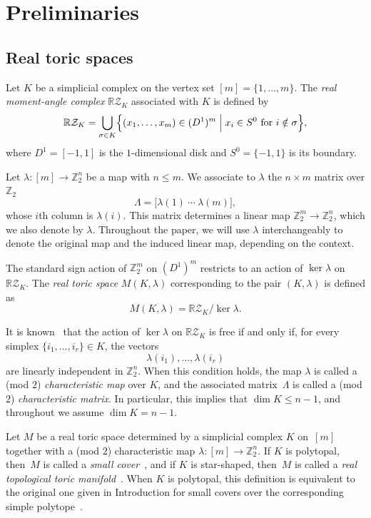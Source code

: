 \documentclass{amsart}
\newcommand{\cZ}{\mathcal{Z}}
\newcommand{\R}{\mathbb{R}}
\newcommand{\Z}{\mathbb{Z}}
\theoremstyle{plain}
\numberwithin{equation}{section}
\theoremstyle{definition}
\theoremstyle{remark}
\begin{document}
\section{Preliminaries}\label{sec:pre}

\subsection{Real toric spaces}
Let $K$ be a simplicial complex on the vertex set $[m] = \{1,\ldots,m\}$.
The \emph{real moment-angle complex} $\R\cZ_{K}$ associated with $K$ is defined by
\[
\R\cZ_{K}
= \bigcup_{\sigma \in K}
\Bigl\{ (x_1,\ldots,x_m) \in (D^1)^m \;\Big|\; x_i \in S^0 \text{ for } i \notin \sigma \Bigr\},
\]
where $D^1 = [-1,1]$ is the $1$-dimensional disk and $S^0 = \{-1,1\}$ is its boundary.

Let $\lambda \colon [m] \to \Z_2^n$ be a map with $n \le m$. 
We associate to $\lambda$ the $n \times m$ matrix over $\Z_2$
\[
\Lambda = \big[\lambda(1)\ \cdots\ \lambda(m)\big],
\]
whose $i$th column is $\lambda(i)$. 
This matrix determines a linear map $\Z_2^m \to \Z_2^n$, which we also denote by $\lambda$.
Throughout the paper, we will use $\lambda$ interchangeably to denote the original map and the induced linear map, depending on the context.

The standard sign action of $\Z_2^m$ on $(D^1)^m$ restricts to an action of $\ker \lambda$ on $\R\cZ_{K}$.
The \emph{real toric space} $M(K,\lambda)$ corresponding to the pair $(K,\lambda)$ is defined as
$$
    M(K,\lambda) = \R\cZ_{K} / \ker \lambda.
$$

It is known~\cite{Choi-Kaji-Theriault2017} that the action of $\ker \lambda$ on $\R\cZ_{K}$ is free if and only if, for every simplex $\{i_1,\ldots,i_r\} \in K$, the vectors
\[
\lambda(i_1), \ldots, \lambda(i_r)
\]
are linearly independent in $\Z_2^n$.
When this condition holds, the map $\lambda$ is called a (mod $2$) \emph{characteristic map} over $K$, and the associated matrix~$\Lambda$ is called a (mod $2$) \emph{characteristic matrix}.
In particular, this implies that $\dim K \le n-1$, and throughout we assume $\dim K = n-1$.

Let $M$ be a real toric space determined by a simplicial complex $K$ on~$[m]$ together with a (mod $2$) characteristic map $\lambda \colon [m] \to \Z_2^n$.
If $K$ is polytopal, then~$M$ is called a \emph{small cover}~\cite{Davis-Januszkiewicz1991}, and if $K$ is star-shaped, then~$M$ is called a \emph{real topological toric manifold}~\cite{Ishida-Fukukawa-Masuda2013}.
When $K$ is polytopal, this definition is equivalent to the original one given in Introduction for small covers over the corresponding simple polytope~\cite{Davis-Januszkiewicz1991,Buchstaber-Panov2015book}.
\end{document}
